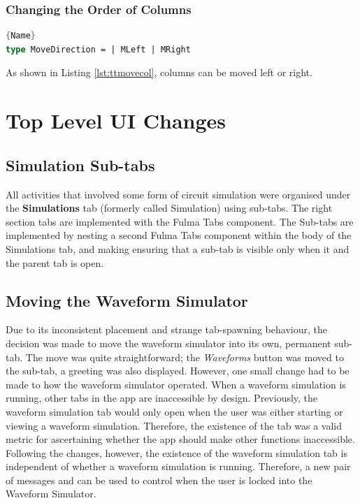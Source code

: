 \subsubsection{Changing the Order of Columns}
\begin{lstlisting}[caption=Definition for Movement Direction,frame=tlrb, language=FSharp, label=lst:ttmovecol]{Name}
type MoveDirection = | MLeft | MRight
\end{lstlisting} 
As shown in Listing \ref{lst:ttmovecol}, columns can be moved left or right.

\section{Top Level UI Changes}
\subsection{Simulation Sub-tabs}
All activities that involved some form of circuit simulation were organised under the \textbf{Simulations} tab (formerly called Simulation) using sub-tabs. The right section tabs are implemented with the Fulma \cite{fulmaio} Tabs component. The Sub-tabs are implemented by nesting a second Fulma Tabs component within the body of the Simulations tab, and making ensuring that a sub-tab is visible only when it and the parent tab is open.

\subsection{Moving the Waveform Simulator}
Due to its inconsistent placement and strange tab-spawning behaviour, the decision was made to move the waveform simulator into its own, permanent sub-tab. The move was quite straightforward; the \textit{Waveforms} button was moved to the sub-tab, a greeting was also displayed. However, one small change had to be made to how the waveform simulator operated. When a waveform simulation is running, other tabs in the app are inaccessible by design. Previously, the waveform simulation tab would only open when the user was either starting or viewing a waveform simulation. Therefore, the existence of the tab was a valid metric for ascertaining whether the app should make other functions inaccessible. Following the changes, however, the existence of the waveform simulation tab is independent of whether a waveform simulation is running. Therefore, a new pair of messages  and  can be used to control when the user is locked into the Waveform Simulator.


